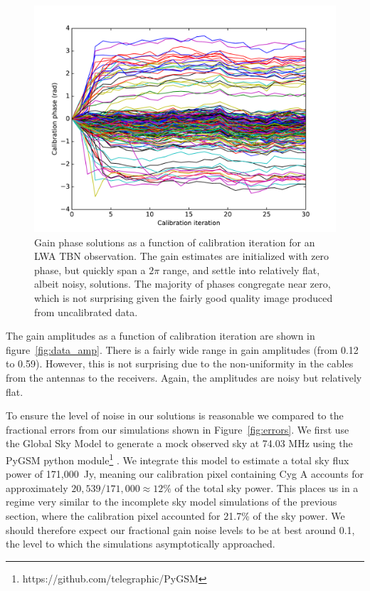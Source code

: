 \documentclass[a4paper,fleqn,usenatbib]{mnras}
\begin{document}
\begin{figure}
\begin{center}
\includegraphics[width=\columnwidth]{fig7.pdf}
\caption{Gain phase solutions as a function of calibration iteration for an LWA TBN observation. 
The gain estimates are initialized with zero phase, but quickly span a $2\pi$ range, and settle 
into relatively flat, albeit noisy, solutions. The majority of phases congregate near zero, which is 
not surprising given the fairly good quality image produced from uncalibrated data.
}
\label{fig:data_phase}
\end{center}
\end{figure}

The gain amplitudes as a function of calibration iteration are shown in 
figure~\ref{fig:data_amp}. There is a fairly wide range in gain amplitudes (from 0.12 to 0.59). 
However, this is not surprising due to the non-uniformity in the cables from the antennas to the 
receivers. Again, the amplitudes are noisy but relatively flat.

To ensure the level of noise in our solutions is reasonable we compared to the fractional errors
from our simulations shown in Figure~\ref{fig:errors}. We first use the Global Sky Model
\citep{deo08} to generate a mock observed sky at 74.03 MHz using the PyGSM python 
module\footnote{https://github.com/telegraphic/PyGSM} \citep{pri16}. We integrate this model
to estimate a total sky flux power of 171,000~Jy, meaning our calibration pixel containing
Cyg A accounts for  approximately $20,539/171,000 \approx 12\%$ of the total sky power. 
This places us in a regime very similar to the incomplete sky model simulations of the 
previous section, where the calibration pixel accounted for 21.7\% of the sky power. We 
should therefore expect our fractional gain noise levels to be at best around 0.1, the level 
to which the simulations asymptotically approached. 
\end{document}
